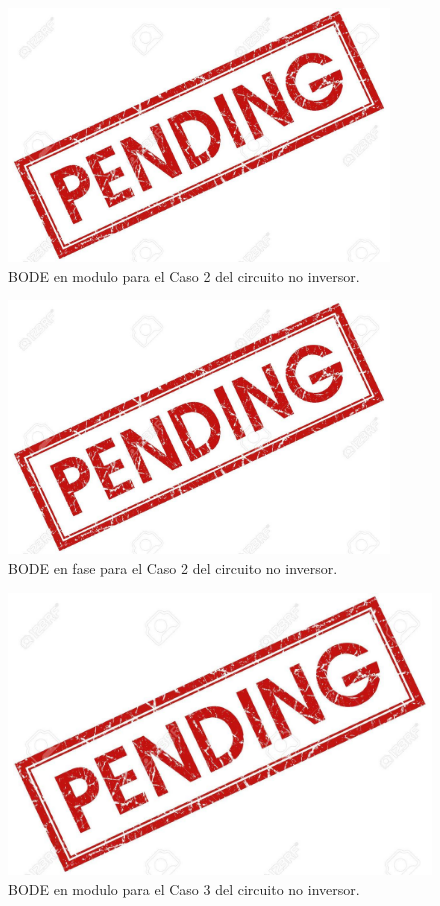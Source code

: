 \begin{figure}[H]	
	\centering
	\includegraphics[width=0.9\textwidth]{ImagenesAux/pend.jpg}
	\caption{BODE en modulo para el Caso 2 del circuito no inversor.}
	\label{fig:NoInvCompZinC2}
\end{figure} 

\begin{figure}[H]	
	\centering
	\includegraphics[width=0.9\textwidth]{ImagenesAux/pend.jpg}
	\caption{BODE en fase para el Caso 2 del circuito no inversor.}
	\label{fig:NoInvCompZinphC2}
\end{figure} 

\begin{figure}[H]	
	\centering
	\includegraphics[width=\textwidth]{ImagenesAux/pend.jpg}
	\caption{BODE en modulo para el Caso 3 del circuito no inversor.}
	\label{fig:NoInvCompZinC3}
\end{figure} 

